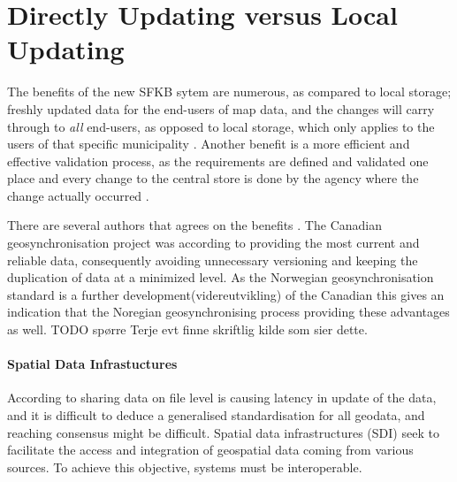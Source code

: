 \chapter{Directly Updating versus Local Updating}
The benefits of the new SFKB sytem are numerous, as compared to local storage; freshly updated data for the end-users of map data, and the changes will carry through to \textit{all} end-users, as opposed to local storage, which only applies to the users of that specific municipality \citep{Dontigney2017}. Another benefit is a more efficient and effective validation process, as the requirements are defined and validated one place and every change to the central store is done by the agency where the change actually occurred \citep{Kartverket2017e}. 

There are several authors that agrees on the benefits \citep{Reichardt2012, Zhao2012}. The Canadian geosynchronisation project was according to \cite{Reichardt2012} providing the most current and reliable data, consequently avoiding unnecessary versioning and keeping the duplication of data at a minimized level. As the Norwegian geosynchronisation standard is a further development(videreutvikling) of the Canadian this gives an indication that the Noregian geosynchronising process providing these advantages as well. TODO spørre Terje evt finne skriftlig kilde som sier dette. 



\subsubsection{Spatial Data Infrastuctures}

According to \cite{Peng2005} sharing data on file level is causing latency in update of the data, and it is difficult to deduce a generalised standardisation for all geodata, and reaching consensus might be difficult.  Spatial data infrastructures (SDI) seek to facilitate the access and integration of geospatial data coming from various sources. To achieve this objective, systems must be interoperable. \cite{giuliani2013} 

